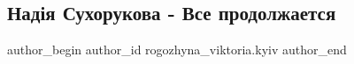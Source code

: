  
 
 
 
 

\subsection{Надія Сухорукова - Все продолжается}
\label{sec:22_06_2022.fb.rogozhyna_viktoria.kyiv.1.nad_ya_sukhorukova__}

\ifcmt
 author_begin
   author_id rogozhyna_viktoria.kyiv
 author_end
\fi
